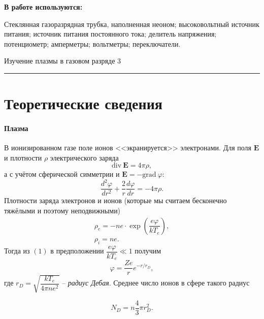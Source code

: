 \documentclass[12pt,a4paper]{scrartcl}
\begin{document}
	\textbf{В работе используются:}
	
	Стеклянная газоразрядная трубка, наполнен­ная неоном; высоковольтный источник питания; источник питания посто­янного тока; делитель напряжения; потенциометр; амперметры; вольтмет­ры; переключатели.

	\newpage


	\begin{flushleft}
		\footnotesize{Изучение плазмы в газовом разряде} \hspace{\fill} \footnotesize{3}
		\\[-0.3cm]\noindent\rule{\textwidth}{0.3pt}
	\end{flushleft}	

	\section{Теоретические сведения}

	\paragraph{Плазма} \hfill
	
	В ионизированном газе поле ионов <<экранируется>> электронами. Для поля $\mathbf{E}$ и плотности $\rho$ электрического заряда
$$
\text{div}~\mathbf{E} = 4 \pi \rho,
$$
а с учётом сферической симметрии и $\mathbf{E} = -\text{grad}~\varphi$:
\begin{equation}
\dfrac{d^2 \varphi}{dr^2}+\dfrac{2}{r}\dfrac{d\varphi}{dr}=-4\pi \rho.
\end{equation}
Плотности заряда электронов и ионов (которые мы считаем бесконечно тяжёлыми и поэтому неподвижными)
\begin{equation}
\begin{array}{c}
\rho_e = -ne \cdot \exp\left(\dfrac{e\varphi}{kT_e}\right),\\
\rho_i = ne.
\end{array}
\end{equation}
Тогда из $(1)$ в предположении $\dfrac{e\varphi}{kT_e} \ll 1$ получим
\begin{equation}
\varphi = \dfrac{Ze}{r}e^{-r/r_D},
\end{equation}
где $r_D = \sqrt{\dfrac{kT_e}{4\pi n e^2}}$ -- \textit{радиус Дебая}. Среднее число ионов в сфере такого радиус

\begin{equation}
N_D = n\dfrac{4}{3}\pi r_D^2.
\end{equation}
\end{document}
